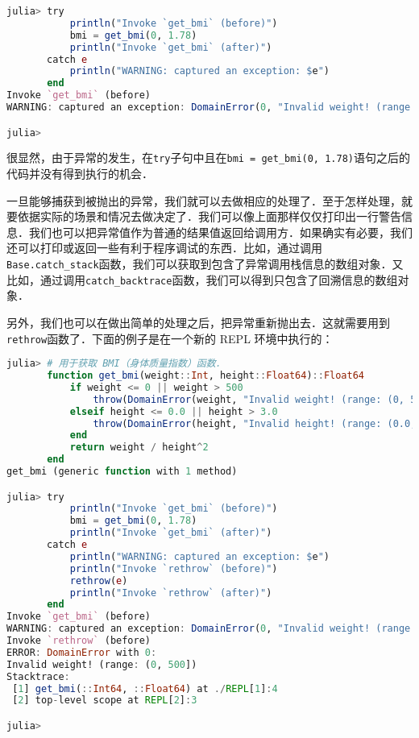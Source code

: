 \begin{lstlisting}[language=julia]
julia> try 
           println("Invoke `get_bmi` (before)")
           bmi = get_bmi(0, 1.78)
           println("Invoke `get_bmi` (after)")
       catch e
           println("WARNING: captured an exception: $e")
       end
Invoke `get_bmi` (before)
WARNING: captured an exception: DomainError(0, "Invalid weight! (range: (0, 500])")

julia> 
\end{lstlisting}

很显然，由于异常的发生，在\verb|try|子句中且在\verb|bmi = get_bmi(0, 1.78)|语句之后的代码并没有得到执行的机会．

一旦能够捕获到被抛出的异常，我们就可以去做相应的处理了．至于怎样处理，就要依据实际的场景和情况去做决定了．我们可以像上面那样仅仅打印出一行警告信息．我们也可以把异常值作为普通的结果值返回给调用方．如果确实有必要，我们还可以打印或返回一些有利于程序调试的东西．比如，通过调用\verb|Base.catch_stack|函数，我们可以获取到包含了异常调用栈信息的数组对象．又比如，通过调用\verb|catch_backtrace|函数，我们可以得到只包含了回溯信息的数组对象．

另外，我们也可以在做出简单的处理之后，把异常重新抛出去．这就需要用到\verb|rethrow|函数了．下面的例子是在一个新的 REPL 环境中执行的：

\begin{lstlisting}[language=julia]
julia> # 用于获取 BMI（身体质量指数）函数．
       function get_bmi(weight::Int, height::Float64)::Float64
           if weight <= 0 || weight > 500
               throw(DomainError(weight, "Invalid weight! (range: (0, 500])"))
           elseif height <= 0.0 || height > 3.0
               throw(DomainError(height, "Invalid height! (range: (0.0, 3.0])"))
           end
           return weight / height^2
       end
get_bmi (generic function with 1 method)

julia> try 
           println("Invoke `get_bmi` (before)")
           bmi = get_bmi(0, 1.78)
           println("Invoke `get_bmi` (after)")
       catch e
           println("WARNING: captured an exception: $e")
           println("Invoke `rethrow` (before)")
           rethrow(e)
           println("Invoke `rethrow` (after)")
       end
Invoke `get_bmi` (before)
WARNING: captured an exception: DomainError(0, "Invalid weight! (range: (0, 500])")
Invoke `rethrow` (before)
ERROR: DomainError with 0:
Invalid weight! (range: (0, 500])
Stacktrace:
 [1] get_bmi(::Int64, ::Float64) at ./REPL[1]:4
 [2] top-level scope at REPL[2]:3

julia> 
\end{lstlisting}

